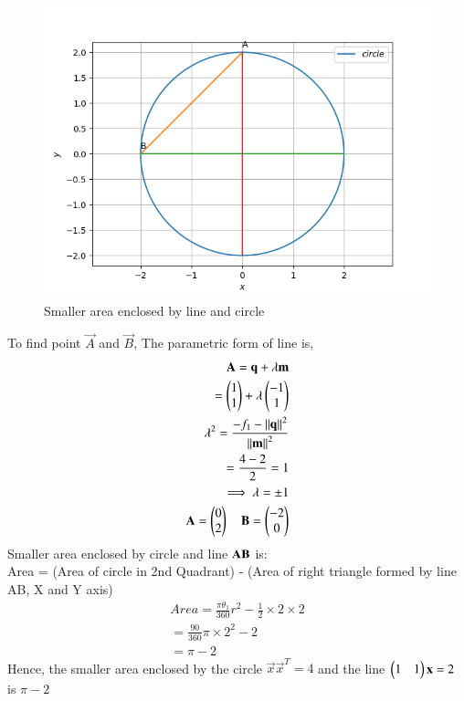 \documentclass[journal,12pt,twocolumn]{IEEEtran}
\begin{document}
\begin{figure}[h!]
	\centering
	\includegraphics[width=\columnwidth]{circle.png}
	\caption{Smaller area enclosed by line and circle}
	\label{eq:myfig}
\end{figure}

To find point $\vec{A}$ and $\vec{B}$,
The parametric form of line is,
\begin{align}
    \mathbf{A} = \mathbf{q}+\lambda\mathbf{m}\label{eq9}\\
            = \begin{pmatrix}1\\1\end{pmatrix}+\lambda\begin{pmatrix}-1\\1\end{pmatrix}\label{eq10}\\
    \lambda^2 = \frac{-f_1-\left\lVert\mathbf{q}\right\rVert^2}{\left\lVert\mathbf{m}\right\rVert^2}\label{eq11}\\
                = \frac{4-2}{2} = 1\label{eq12}\\
    \implies \lambda = \pm{1} \label{eq13}\\
    \mathbf{A} = \begin{pmatrix}0\\2\end{pmatrix}\quad \mathbf{B} = \begin{pmatrix}-2\\0\end{pmatrix}\label{eq14}
\end{align}
Smaller area enclosed by circle and line $\bf{AB}$ is:\\
 Area = (Area of circle in 2nd Quadrant) - (Area of right triangle formed by line AB, X and Y axis)
 \begin{align}
Area=\frac{\pi\theta_1}{360}r^2-\frac{1}{2}\times2\times2\label{eq15}\\
=\frac{90}{360}\pi\times2^2-2\label{eq16}\\
=\pi-2\label{eq17}
\end{align}
Hence, the smaller area enclosed by the circle  $\vec{x}\vec{x}^T=4$ and the line $\begin{pmatrix}1 & 1\end{pmatrix} \mathbf{x}=2$ is $\pi-2$
\end{document}
